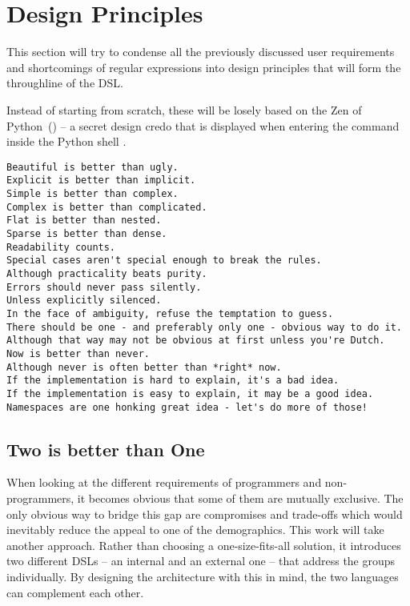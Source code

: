\section{Design Principles} \label{sec:dslDesignPrinciples}

This section will try to condense all the previously discussed user requirements and shortcomings of regular expressions into design principles that will form the throughline of the DSL.

Instead of starting from scratch, these will be losely based on the Zen of Python~() -- a secret design credo that is displayed when entering the command  inside the Python shell \cite{ZenOfPython}.

\begin{listingBox}[float=t!,title={The Zen of Python, by Tim Peters}, label=fig:zenOfPython]
\begin{lstlisting}[basicstyle=\footnotesize\ttfamily]
Beautiful is better than ugly. 
Explicit is better than implicit. 
Simple is better than complex. 
Complex is better than complicated. 
Flat is better than nested. 
Sparse is better than dense. 
Readability counts. 
Special cases aren't special enough to break the rules. 
Although practicality beats purity. 
Errors should never pass silently. 
Unless explicitly silenced. 
In the face of ambiguity, refuse the temptation to guess. 
There should be one - and preferably only one - obvious way to do it. 
Although that way may not be obvious at first unless you're Dutch. 
Now is better than never. 
Although never is often better than *right* now. 
If the implementation is hard to explain, it's a bad idea. 
If the implementation is easy to explain, it may be a good idea. 
Namespaces are one honking great idea - let's do more of those! 
\end{lstlisting}
\end{listingBox}

\subsection{Two is better than One} \label{sec:twoIsBetter}

When looking at the different requirements of programmers and non-programmers, it becomes obvious that some of them are mutually exclusive. The only obvious way to bridge this gap are compromises and trade-offs which would inevitably reduce the appeal to one of the demographics. This work will take another approach. Rather than choosing a one-size-fits-all solution, it introduces two different DSLs -- an internal and an external one -- that address the groups individually. By designing the architecture with this in mind, the two languages can complement each other.

